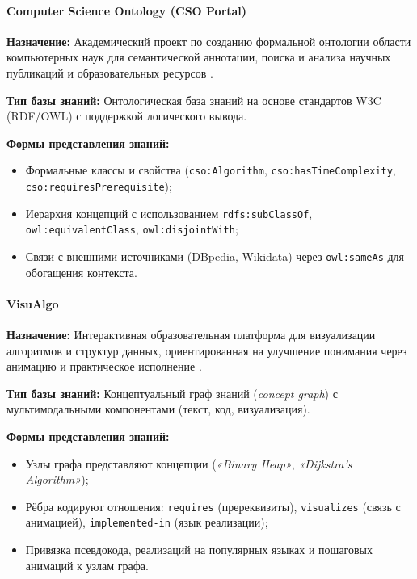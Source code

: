 \paragraph{Computer Science Ontology (CSO Portal)}

\textbf{Назначение:} Академический проект по созданию формальной онтологии области компьютерных наук для семантической аннотации, поиска и анализа научных публикаций и образовательных ресурсов \cite{web:csoportal}.

\textbf{Тип базы знаний:} Онтологическая база знаний на основе стандартов W3C (RDF/OWL) с поддержкой логического вывода.

\textbf{Формы представления знаний:}
\begin{itemize}
    \item Формальные классы и свойства (\texttt{cso:Algorithm}, \texttt{cso:hasTimeComplexity}, \texttt{cso:requiresPrerequisite});
    \item Иерархия концепций с использованием \texttt{rdfs:subClassOf}, \texttt{owl:equivalentClass}, \texttt{owl:disjointWith};
    \item Связи с внешними источниками (DBpedia, Wikidata) через \texttt{owl:sameAs} для обогащения контекста.
\end{itemize}

\paragraph{VisuAlgo}

\textbf{Назначение:} Интерактивная образовательная платформа для визуализации алгоритмов и структур данных, ориентированная на улучшение понимания через анимацию и практическое исполнение \cite{web:visualgo}.

\textbf{Тип базы знаний:} Концептуальный граф знаний (\textit{concept graph}) с мультимодальными компонентами (текст, код, визуализация).

\textbf{Формы представления знаний:}
\begin{itemize}
    \item Узлы графа представляют концепции (\textit{«Binary Heap»}, \textit{«Dijkstra's Algorithm»});
    \item Рёбра кодируют отношения: \texttt{requires} (пререквизиты), \texttt{visualizes} (связь с анимацией), \texttt{implemented-in} (язык реализации);
    \item Привязка псевдокода, реализаций на популярных языках и пошаговых анимаций к узлам графа.
\end{itemize}

